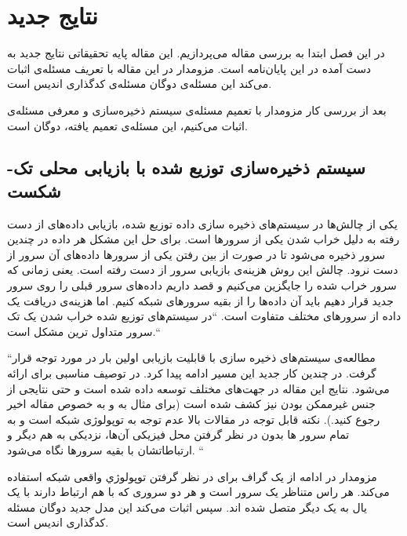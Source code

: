 \chapter{نتایج جدید}
\label{chapter:results}
در این فصل ابتدا به بررسی مقاله
\cite{arya}
 می‌پردازیم. این مقاله پایه تحقیقاتی نتایج جدید به دست آمده در این پایان‌نامه است. مزومدار در این مقاله با تعریف مسئله‌ی
اثبات می‌کند این مسئله‌ی دوگان مسئله‌ی کدگذاری اندیس است.

بعد از بررسی کار مزومدار با تعمیم مسئله‌ی سیستم ذخیره‌سازی و معرفی مسئله‌ی
 اثبات می‌کنیم، این مسئله‌ی تعمیم یافته، دوگان 
 \lpicod
  است.
\newpage

\section{
سیستم ذخیره‌سازی توزیع شده با بازیابی محلی تک-شکست \SFRDSS
}
یکی از چالش‌ها در سیستم‌های ذخیره سازی داده توزیع شده، بازیابی داده‌های از دست رفته به دلیل خراب شدن یکی از سرورها است. 
برای حل این مشکل هر داده در چندین سرور ذخیره می‌شود تا در صورت از بین رفتن یکی از سرورها داده‌های آن سرور از دست نرود. چالش این روش هزینه‌ی بازیابی سرور از دست رفته است. یعنی زمانی که سرور خراب شده را جایگزین می‌کنیم و قصد داریم داده‌های سرور قبلی را روی سرور جدید قرار دهیم باید آن داده‌ها را از بقیه سرورهای شبکه 
کنیم. اما هزینه‌ی دریافت یک داده از سرورهای مختلف متفاوت است.
``در سیستم‌های توزیع شده خراب شدن یک تک سرور متداول ترین مشکل است.``

``مطالعه‌ی سیستم‌های ذخیره سازی با قابلیت بازیابی اولین بار در
\cite{5550492}
مورد توجه قرار گرفت. در چندین کار جدید این مسیر ادامه پیدا کرد. در
\cite{6259860}
توصیف مناسبی برای
ارائه می‌شود. نتایج این مقاله در جهت‌های مختلف توسعه داده شده است و حتی نتایجی از جنس غیرممکن بودن نیز کشف شده است (برای مثال به
\cite{6570829, kamath2013codes,6818438,silberstein2013optimal, tamo2013optimal}
و به خصوص مقاله اخیر 
\cite{Tamo_2014}
رجوع کنید.). نکته قابل توجه در مقالات بالا عدم توجه به توپولوژی شبکه است و به تمام سرور ها بدون در نظر گرفتن محل فیزیکی آن‌ها، نزدیکی به هم دیگر و ارتباطاتشان با بقیه سرورها نگاه می‌شود.
 ``
 
 مزومدار در ادامه از یک گراف برای در نظر گرفتن توپولوژي واقعی شبکه استفاده می‌کند. هر راس متناظر یک سرور است و هر دو سروری که با هم ارتباط دارند با یک یال به یک دیگر متصل شده اند. سپس اثبات می‌کند این مدل جدید دوگان مسئله کدگذاری اندیس است.
 

